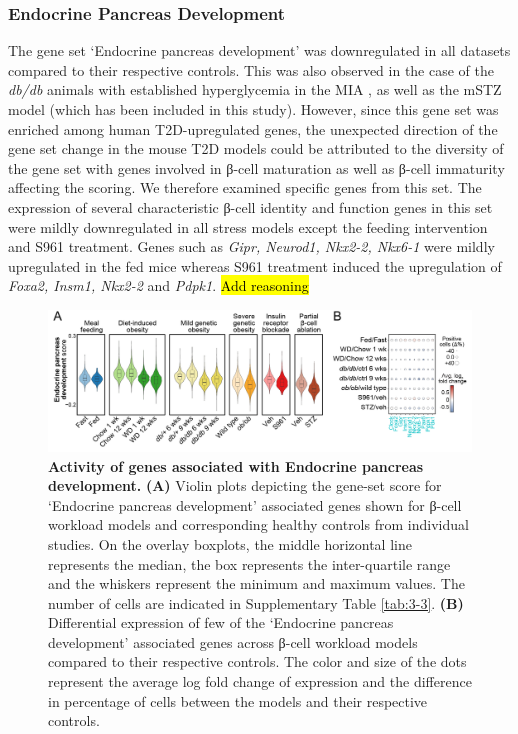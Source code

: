 \subsubsection{Endocrine Pancreas Development}
The gene set `Endocrine pancreas development' was downregulated in all datasets compared to their respective controls. This was also observed in the case of the \textit{db/db} animals with established hyperglycemia in the MIA , as well as the mSTZ model (which has been included in this study). However, since this gene set  was enriched among human T2D-upregulated genes, the unexpected direction of the gene set change in the mouse T2D models could be attributed to the diversity of the gene set with genes involved in β-cell maturation as well as β-cell immaturity affecting the scoring. We therefore examined specific genes from this set. The expression of several characteristic β-cell identity and function genes in this set were mildly downregulated in all stress models except the feeding intervention and S961 treatment. Genes such as \textit{Gipr, Neurod1, Nkx2-2, Nkx6-1} were mildly upregulated in the fed mice whereas S961 treatment induced the upregulation of \textit{Foxa2, Insm1, Nkx2-2}  and \textit{Pdpk1}. \hl{Add reasoning}

\begin{figure}[t]
\centering
\includegraphics[width=\linewidth]{Chapter5/Fig/F3-13-01.png}
\caption[Gene-set scoring of `\textit{Endocrine pancreas development}']{\textbf{Activity of genes associated with Endocrine pancreas development.} \textbf{(A)} Violin plots depicting the gene-set score for `Endocrine pancreas development' associated genes shown for β-cell workload models and corresponding healthy controls from individual studies. On the overlay boxplots, the middle horizontal line represents the median, the box represents the inter-quartile range and the whiskers represent the minimum and maximum values. The number of cells are indicated in Supplementary Table \ref{tab:3-3}. \textbf{(B)} Differential expression of few of the `Endocrine pancreas development' associated genes across β-cell workload models compared to their respective controls. The color and size of the dots represent the average log fold change of expression and the difference in percentage of cells between the models and their respective controls.}
\label{fig:3-13-1}
\end{figure}


